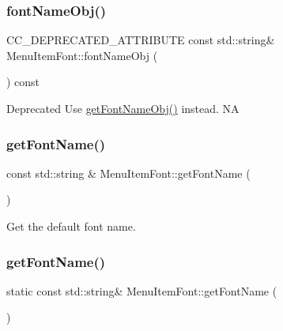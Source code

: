 \subsubsection{\texorpdfstring{font\+Name\+Obj()}{fontNameObj()}\hspace{0.1cm}{\footnotesize\ttfamily [2/2]}}
{\footnotesize\ttfamily C\+C\+\_\+\+D\+E\+P\+R\+E\+C\+A\+T\+E\+D\+\_\+\+A\+T\+T\+R\+I\+B\+U\+TE const std\+::string\& Menu\+Item\+Font\+::font\+Name\+Obj (\begin{DoxyParamCaption}{ }\end{DoxyParamCaption}) const\hspace{0.3cm}{\ttfamily [inline]}}

Deprecated Use \hyperlink{classMenuItemFont_a602990369beef06457153f39aefa42b9}{get\+Font\+Name\+Obj()} instead.  NA \mbox{\label{classMenuItemFont_ab5cfddd334c7eadec61292fd1e59a94a}} 
\subsubsection{\texorpdfstring{get\+Font\+Name()}{getFontName()}\hspace{0.1cm}{\footnotesize\ttfamily [1/2]}}
{\footnotesize\ttfamily const std\+::string \& Menu\+Item\+Font\+::get\+Font\+Name (\begin{DoxyParamCaption}{ }\end{DoxyParamCaption})\hspace{0.3cm}{\ttfamily [static]}}

Get the default font name. \mbox{\label{classMenuItemFont_a51cfd7ebdb3b61c1257a0b9abd826ea9}} 
\subsubsection{\texorpdfstring{get\+Font\+Name()}{getFontName()}\hspace{0.1cm}{\footnotesize\ttfamily [2/2]}}
{\footnotesize\ttfamily static const std\+::string\& Menu\+Item\+Font\+::get\+Font\+Name (\begin{DoxyParamCaption}{ }\end{DoxyParamCaption})\hspace{0.3cm}{\ttfamily [static]}}

